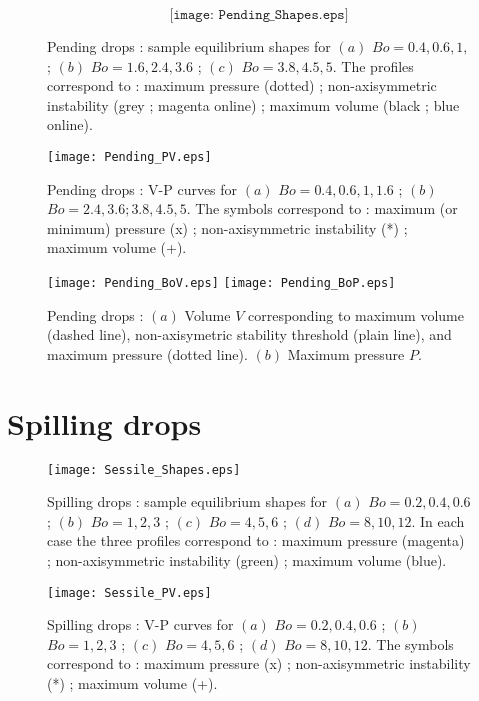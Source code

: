 \begin{figure}
$$
\texttt{[image: Pending\_Shapes.eps]} 
$$
\caption{Pending drops : sample equilibrium shapes for 
$(a)$ $Bo =  0.4, 0.6, 1,$ ; 
$(b)$ $Bo = 1.6, 2.4, 3.6$ ;
$(c)$ $Bo = 3.8, 4.5, 5$. 
The profiles correspond to : maximum pressure (dotted) ; non-axisymmetric instability (grey ; magenta online) ; maximum volume (black ; blue online).
}
\end{figure}

\begin{figure}
\texttt{[image: Pending\_PV.eps]} 
\caption{Pending drops : V-P curves for  
$(a)$ $Bo = 0.4, 0.6, 1, 1.6$ ; 
$(b)$ $Bo = 2.4, 3.6; 3.8, 4.5, 5$. 
The symbols correspond to : maximum (or minimum) pressure (x) ; non-axisymmetric instability (*) ; maximum volume (+).
}
\end{figure}


\begin{figure}
\texttt{[image: Pending\_BoV.eps]}
\texttt{[image: Pending\_BoP.eps]} 
\caption{
Pending drops : $(a)$ Volume $V$ corresponding to maximum volume (dashed line), 
non-axisymetric stability threshold (plain line), and maximum pressure (dotted line).
$(b)$ Maximum pressure $P$.
}
\end{figure}



\section{Spilling drops}


\begin{figure}
\texttt{[image: Sessile\_Shapes.eps]} 
\caption{Spilling drops : sample equilibrium shapes for 
$(a)$ $Bo = 0.2, 0.4, 0.6$ ; 
$(b)$ $Bo = 1, 2, 3$ ;
$(c)$ $Bo = 4, 5, 6$ ;
$(d)$ $Bo = 8, 10, 12$. 
In each case the three profiles correspond to : maximum pressure (magenta) ; non-axisymmetric instability (green) ; maximum volume (blue).
}
\end{figure}

\begin{figure}
\texttt{[image: Sessile\_PV.eps]} 
\caption{Spilling drops : V-P curves for  
$(a)$ $Bo = 0.2, 0.4, 0.6$ ; 
$(b)$ $Bo = 1, 2, 3$ ;
$(c)$ $Bo = 4, 5, 6$ ;
$(d)$ $Bo = 8, 10, 12$. 
The symbols correspond to : maximum pressure (x) ; non-axisymmetric instability (*) ; maximum volume (+).
}
\end{figure}


